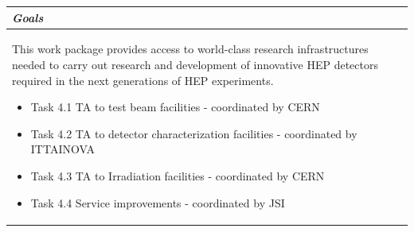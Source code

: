 \begin{table}[H]
{\begin{tabular}{|p{}|}
        \hline
        \rowcolor{mylightergray} \textit{Goals} \\
        \hline
        \rowcolor{white} 
        \hspace*{-0.75cm} 
        \begin{minipage}[t]{\textwidth}
        {\leftskip=15pt
        This work package provides access to world-class research infrastructures needed to carry out research and development of innovative HEP detectors required in the next generations of HEP experiments.
    		\begin{itemize}
    		    \item Task 4.1 TA to test beam facilities - coordinated by CERN
    			\item Task 4.2 TA to detector characterization facilities - coordinated by ITTAINOVA
			    \item Task 4.3 TA to Irradiation facilities - coordinated by CERN
                    \item Task 4.4 Service improvements - coordinated by JSI
    		\end{itemize} 
    		\vspace*{0.10em}
        }
	\end{minipage}        
        \\
        \hline
    \end{tabular}}
    \vspace{0.5em}\vfill
\end{table}
